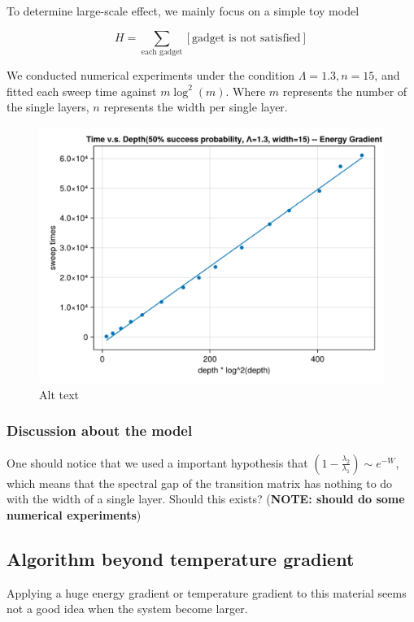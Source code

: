 \documentclass[twocolumn,superscriptaddress,english,showpacs,longbibliography]{revtex4-2}
\begin{document}
To determine large-scale effect, we mainly focus on a simple toy model

\[
H = \sum_{\text{each gadget}} [\text{gadget is not satisfied}]
\]

We conducted numerical experiments under the condition
$\Lambda = 1.3, n = 15$, and fitted each sweep time against
$m \log^2(m)$. Where $m$ represents the number of the single layers,
$n$ represents the width per single layer.

\begin{figure}
\centering
\includegraphics[keepaspectratio]{../notes/images/toy_model_gradient_time_vs_depth_1_3.png}
\caption{Alt text}
\end{figure}

\subsubsection{Discussion about the
model}\label{discussion-about-the-model}

One should notice that we used a important hypothesis that
$(1-\frac{\lambda_2}{\lambda_1}) \sim e^{-W}$, which means that the
spectral gap of the transition matrix has nothing to do with the width
of a single layer. Should this exists? (\textbf{NOTE: should do some
numerical experiments})

\subsection{Algorithm beyond temperature
gradient}\label{algorithm-beyond-temperature-gradient}

Applying a huge energy gradient or temperature gradient to this material
seems not a good idea when the system become larger.
\end{document}
